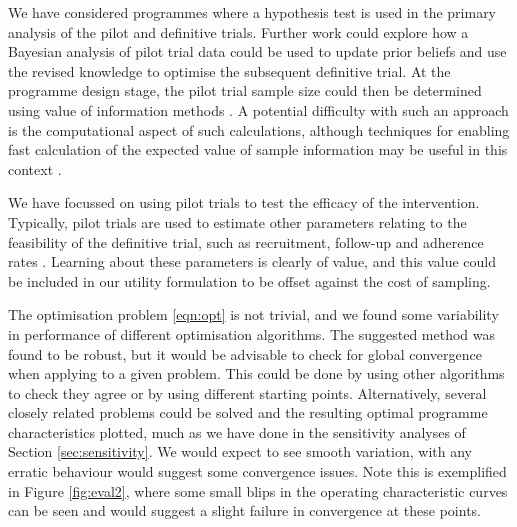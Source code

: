 \documentclass[sagev, Crown]{sagej} %
\begin{document}


We have considered programmes where a hypothesis test is used in the primary analysis of the pilot and definitive trials. Further work could explore how a Bayesian analysis of pilot trial data could be used to update prior beliefs and use the revised knowledge to optimise the subsequent definitive trial. At the programme design stage, the pilot trial sample size could then be determined using value of information methods \cite{Willan2005}. A potential difficulty with such an approach is the computational aspect of such calculations, although techniques for enabling fast calculation of the expected value of sample information may be useful in this context \cite{Strong2015, Heath2019}. 

We have focussed on using pilot trials to test the efficacy of the intervention. Typically, pilot trials are used to estimate other parameters relating to the feasibility of the definitive trial, such as recruitment, follow-up and adherence rates \cite{Avery2017}. Learning about these parameters is clearly of value, and this value could be included in our utility formulation to be offset against the cost of sampling.

The optimisation problem \ref{eqn:opt} is not trivial, and we found some variability in performance of different optimisation algorithms. The suggested method was found to be robust, but it would be advisable to check for global convergence when applying to a given problem. This could be done by using other algorithms to check they agree or by using different starting points. Alternatively, several closely related problems could be solved and the resulting optimal programme characteristics plotted, much as we have done in the sensitivity analyses of Section \ref{sec:sensitivity}. We would expect to see smooth variation, with any erratic behaviour would suggest some convergence issues. Note this is exemplified in Figure \ref{fig:eval2}, where some small blips in the operating characteristic curves can be seen and would suggest a slight failure in convergence at these points.
\end{document}
